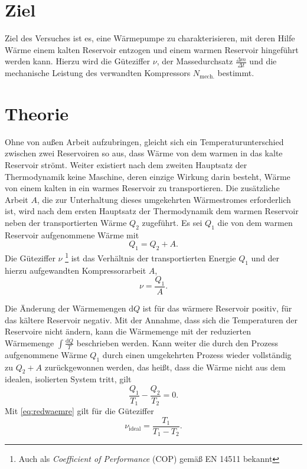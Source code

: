 \section{Ziel}
\label{sec:Ziel}
Ziel des Versuches ist es, eine Wärmepumpe zu charakterisieren, mit deren Hilfe Wärme einem kalten Reservoir entzogen und einem warmen Reservoir hingeführt werden kann.
Hierzu wird die Güteziffer $\nu$, der Massedurchsatz $\frac{\Delta{m}}{\Delta{t}}$ und die mechanische Leistung des verwandten Kompressors $N_\text{mech.}$ bestimmt.
\section{Theorie}
\label{sec:Theorie}
Ohne von außen Arbeit aufzubringen, gleicht sich ein Temperaturunterschied zwischen zwei Reservoiren so aus, 
dass Wärme von dem warmen in das kalte Reservoir strömt.
Weiter existiert nach dem zweiten Hauptsatz der Thermodynamik keine Maschine, deren einzige Wirkung darin besteht, Wärme von einem kalten in ein warmes Reservoir zu transportieren\cite{hauptsaetzederthermodynamik}.
Die zusätzliche Arbeit $A$, die zur Unterhaltung dieses umgekehrten Wärmestromes erforderlich ist, wird nach dem ersten Hauptsatz der Thermodynamik dem warmen Reservoir neben der transportierten Wärme $Q_2$ %
zugeführt.
Es sei $Q_1$ die von dem warmen Reservoir aufgenommene Wärme mit
\begin{equation}
	Q_1 = Q_2+A.
	\label{eq:waermetransport}
\end{equation}
Die Güteziffer $\nu$ \footnote{Auch als \textit{Coefficient of Performance} (COP) gemäß EN 14511 bekannt} ist das Verhältnis der transportierten Energie $Q_1$ und der hierzu aufgewandten Kompressorarbeit $A$,
\begin{equation}
	\nu = \frac{Q_1}{A}.
	\label{eq:gueteziffer}
\end{equation}

\noindent Die Änderung der Wärmemengen $\mathup{d}Q$ ist für das wärmere Reservoir positiv, für das kältere Reservoir negativ.
Mit der Annahme, dass sich die Temperaturen der Reservoire nicht ändern, kann die Wärmemenge mit der reduzierten Wärmemenge $\int \frac{\mathup{d}Q}{T}$ beschrieben werden. 
Kann weiter die durch den Prozess aufgenommene Wärme $Q_1$ durch einen umgekehrten Prozess wieder vollständig zu $Q_2 + A$ zurückgewonnen werden, das heißt, dass die Wärme nicht aus dem idealen, isolierten System tritt, gilt
\begin{equation}
	\frac{Q_1}{T_1}-\frac{Q_2}{T_2} = 0.
	\label{eq:redwaemre}
\end{equation}
Mit \eqref{eq:redwaemre} gilt für die Güteziffer
\begin{equation}
	\nu_{\text{ideal}} = \frac{T_1}{T_1-T_2}.
	\label{eq:gueteziffer_ideal}
\end{equation}

